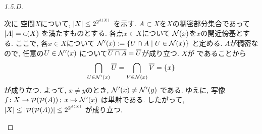 \documentclass[uplatex, dvipdfmx, a4paper, 12pt, class=jsarticle, crop=false]{standalone}
\begin{document}
\begin{proof}[1.5.D]
\begin{enumerate}
		次に \Hausdorff 空間\( X \)について,
		\( \cardinality{X} \leq
		2^{2^{\topdensity{X}}}\)
		を示す.
		\( A \subset X \)を\( X \)の稠密部分集合であって
		\( \cardinality{A} = \topdensity{X} \)
		を満たすものとする.
		各点\( x \in X \)について
		\( \mathcal{N}\lrparen{x} \)を\( x \)の開近傍基とする.
		ここで, 各\( x \in X \)について
		\( \mathcal{N}'\lrparen{x}
		\defeq \setcomp{U \cap A}{U \in \mathcal{N}\lrparen{x}} \)
		と定める.
		\( A \)が稠密なので, 任意の\( U \in \mathcal{N}'\lrparen{x} \)
		について\( \overline{U \cap A} = \overline{U} \)が成り立つ.
		\( X \)が  であることから
		\[ \bigcap_{U \in \mathcal{N}'\lrparen{x}} \topbar{U}
		= \bigcap_{V \in \mathcal{N}\lrparen{x}} \topbar{V}
		= \lrbrace{x} \]
		が成り立つ.
		よって, \( x \neq y \)のとき,
		\( \mathcal{N}'\lrparen{x} \neq \mathcal{N}'\lrparen{y} \)
		である.
		ゆえに, 写像\( \morphto{f}{X}{\pow(\pow(A))}
		{x}{\mathcal{N}'\lrparen{x}} \)
		は単射である.
		したがって,
		\( \cardinality{X} \leq \cardinality{\pow(\pow(A))}
		\leq 2^{2^{\topdensity{X}}} \)
		が成り立つ.


\end{enumerate}
\end{proof}
\end{document}
